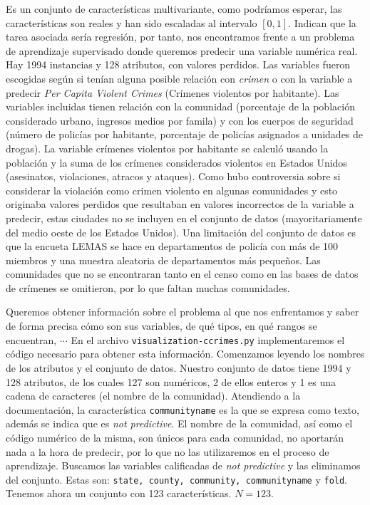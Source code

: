 \documentclass[a4paper, 20pt]{article}
\begin{document}
Es un conjunto de características multivariante, como podríamos esperar, las características son reales y han sido escaladas al intervalo $[0,1]$. Indican que la tarea asociada sería regresión, por tanto, nos encontramos frente a un problema de aprendizaje supervisado donde queremos predecir una variable numérica real. Hay 1994 instancias y 128 atributos, con valores perdidos. Las variables fueron escogidas según si tenían alguna posible relación con \textit{crimen} o con la variable a predecir \textit{Per Capita Violent Crimes} (Crímenes violentos por habitante). Las variables incluidas tienen relación con la comunidad (porcentaje de la población considerado urbano, ingresos medios por famila) y con los cuerpos de seguridad (número de policías por habitante, porcentaje de policías asignados a unidades de drogas). La variable crímenes violentos por habitante se calculó usando la población y la suma de los crímenes considerados violentos en Estados Unidos (asesinatos, violaciones, atracos y ataques). Como hubo controversia sobre si considerar la violación como crimen violento en algunas comunidades y esto originaba valores perdidos que resultaban en valores incorrectos de la variable a predecir, estas ciudades no se incluyen en el conjunto de datos (mayoritariamente del medio oeste de los Estados Unidos). Una limitación del conjunto de datos es que la encueta LEMAS se hace en departamentos de policía con más de 100 miembros y una muestra aleatoria de departamentos más pequeños. Las comunidades que no se encontraran tanto en el censo como en las bases de datos de crímenes se omitieron, por lo que faltan muchas comunidades.

Queremos obtener información sobre el problema al que nos enfrentamos y saber de forma precisa cómo son sus variables, de qué tipos, en qué rangos se encuentran, $\cdots$ En el archivo \texttt{visualization-ccrimes.py} implementaremos el código necesario para obtener esta información. Comenzamos leyendo los nombres de los atributos y el conjunto de datos. Nuestro conjunto de datos tiene 1994 y 128 atributos, de los cuales 127 son numéricos, 2 de ellos enteros y 1 es una cadena de caracteres (el nombre de la comunidad). Atendiendo a la documentación, la característica \texttt{communityname} es la que se expresa como texto, además se indica que es \textit{not predictive}. El nombre de la comunidad, así como el código numérico de la misma, son únicos para cada comunidad, no aportarán nada a la hora de predecir, por lo que no las utilizaremos en el proceso de aprendizaje. Buscamos las variables calificadas de \textit{not predictive} y las eliminamos del conjunto. Estas son: \texttt{state, county, community, communityname} y \texttt{fold}. Tenemos ahora un conjunto con 123 características. $N=123$.
\end{document}
